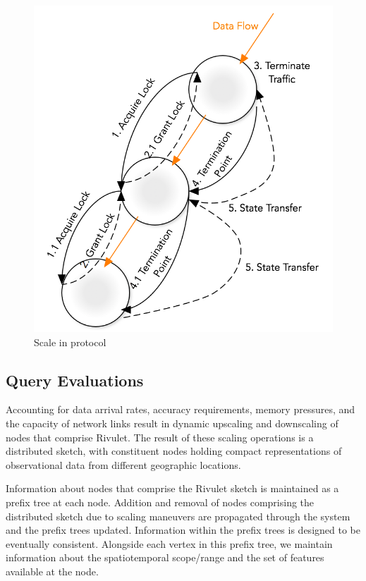 \begin{figure}
    \centerline{\includegraphics[scale=0.55]{figures/scale-in-protocol.png}}
    \caption{Scale in protocol}
    \label{fig:scale-in-protocol}
\end{figure}

\subsection{Query Evaluations}
\label{subsec:query-eval}
Accounting for data arrival rates, accuracy requirements, memory pressures, and the capacity of network links result in dynamic upscaling and downscaling of nodes that comprise Rivulet. The result of these scaling operations is a distributed sketch, with constituent nodes holding compact representations of observational data from different geographic locations. 

Information about nodes that comprise the Rivulet sketch is maintained as a prefix tree at each node. Addition and removal of nodes comprising the distributed sketch due to scaling maneuvers are propagated through the system and the prefix trees updated. Information within the prefix trees is designed to be eventually consistent.  Alongside each vertex in this prefix tree, we maintain information about the spatiotemporal scope/range and the set of features available at the node.  

